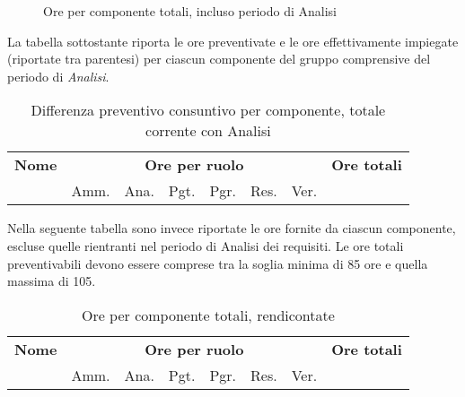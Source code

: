 \begin{figure}[H]
\caption{Ore per componente totali, incluso periodo di Analisi}
\end{figure}

La tabella sottostante riporta le ore preventivate e le ore effettivamente impiegate (riportate tra parentesi) per ciascun componente del gruppo \GroupName{} comprensive del periodo di \textit{Analisi}.

\begin{center}
\begin{table}[H]
\begin{tabular}{lccccccc}
\toprule
    \textbf{Nome}  & \multicolumn{6}{c}{\textbf{Ore per ruolo}} & \textbf{Ore totali} \\
     & Amm. & Ana. & Pgt. & Pgr. & Res. & Ver. & \\
    \midrule
    
    	
    
    \bottomrule
\end{tabular}
\caption{Differenza preventivo consuntivo per componente, totale corrente con Analisi}
\end{table}
\end{center}

Nella seguente tabella sono invece riportate le ore fornite da ciascun componente, escluse quelle rientranti nel periodo di Analisi dei requisiti. 
Le ore totali preventivabili devono essere comprese tra la soglia minima di 85 ore e quella massima di 105.

\begin{table}[H]
\centering
\begin{tabular}{lccccccc}
\toprule 
    \textbf{Nome}  & \multicolumn{6}{c}{\textbf{Ore per ruolo}} & \textbf{Ore totali}\\
     & Amm. & Ana. & Pgt. & Pgr. & Res. & Ver. \\
    \midrule

    	

    \bottomrule
\end{tabular}
\caption{Ore per componente totali, rendicontate}
\end{table}


